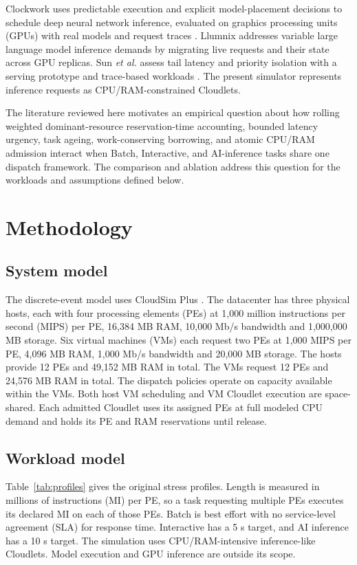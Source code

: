 \documentclass[conference]{IEEEtran}
\begin{document}
Clockwork uses predictable execution and explicit model-placement decisions to schedule deep neural network inference, evaluated on graphics processing units (GPUs) with real models and request traces \cite{gujarati2020clockwork}. Llumnix addresses variable large language model inference demands by migrating live requests and their state across GPU replicas. Sun \emph{et al.} assess tail latency and priority isolation with a serving prototype and trace-based workloads \cite{sun2024llumnix}. The present simulator represents inference requests as CPU/RAM-constrained Cloudlets.

The literature reviewed here motivates an empirical question about how rolling weighted dominant-resource reservation-time accounting, bounded latency urgency, task ageing, work-conserving borrowing, and atomic CPU/RAM admission interact when Batch, Interactive, and AI-inference tasks share one dispatch framework. The comparison and ablation address this question for the workloads and assumptions defined below.

\section{Methodology}
\subsection{System model}
The discrete-event model uses CloudSim Plus \cite{silva2017cloudsim}. The datacenter has three physical hosts, each with four processing elements (PEs) at 1,000 million instructions per second (MIPS) per PE, 16,384 MB RAM, 10,000 Mb/s bandwidth and 1,000,000 MB storage. Six virtual machines (VMs) each request two PEs at 1,000 MIPS per PE, 4,096 MB RAM, 1,000 Mb/s bandwidth and 20,000 MB storage. The hosts provide 12 PEs and 49,152 MB RAM in total. The VMs request 12 PEs and 24,576 MB RAM in total. The dispatch policies operate on capacity available within the VMs. Both host VM scheduling and VM Cloudlet execution are space-shared. Each admitted Cloudlet uses its assigned PEs at full modeled CPU demand and holds its PE and RAM reservations until release.

\subsection{Workload model}
Table~\ref{tab:profiles} gives the original stress profiles. Length is measured in millions of instructions (MI) per PE, so a task requesting multiple PEs executes its declared MI on each of those PEs. Batch is best effort with no service-level agreement (SLA) for response time. Interactive has a 5 s target, and AI inference has a 10 s target. The simulation uses CPU/RAM-intensive inference-like Cloudlets. Model execution and GPU inference are outside its scope.
\end{document}

